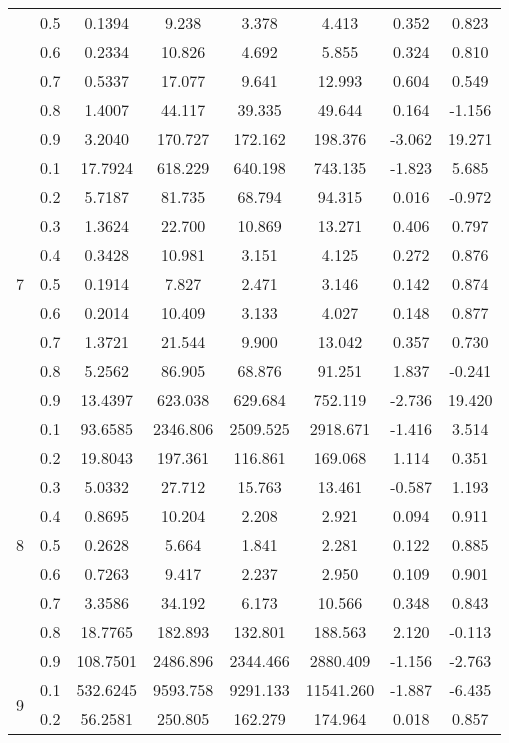 \documentclass[11pt,a4paper]{report}
\begin{document}
\begin{longtable}{ | c | c || c | c | c | c | c | c | }
 & 0.5 & 0.1394 & 9.238 & 3.378 & 4.413 & 0.352 & 0.823 \\
 & 0.6 & 0.2334 & 10.826 & 4.692 & 5.855 & 0.324 & 0.810 \\
 & 0.7 & 0.5337 & 17.077 & 9.641 & 12.993 & 0.604 & 0.549 \\
 & 0.8 & 1.4007 & 44.117 & 39.335 & 49.644 & 0.164 & -1.156 \\
 & 0.9 & 3.2040 & 170.727 & 172.162 & 198.376 & -3.062 & 19.271 \\
 \hline
\multirow{9}{*}{7} & 0.1 & 17.7924 & 618.229 & 640.198 & 743.135 & -1.823 & 5.685 \\
 & 0.2 & 5.7187 & 81.735 & 68.794 & 94.315 & 0.016 & -0.972 \\
 & 0.3 & 1.3624 & 22.700 & 10.869 & 13.271 & 0.406 & 0.797 \\
 & 0.4 & 0.3428 & 10.981 & 3.151 & 4.125 & 0.272 & 0.876 \\
 & 0.5 & 0.1914 & 7.827 & 2.471 & 3.146 & 0.142 & 0.874 \\
 & 0.6 & 0.2014 & 10.409 & 3.133 & 4.027 & 0.148 & 0.877 \\
 & 0.7 & 1.3721 & 21.544 & 9.900 & 13.042 & 0.357 & 0.730 \\
 & 0.8 & 5.2562 & 86.905 & 68.876 & 91.251 & 1.837 & -0.241 \\
 & 0.9 & 13.4397 & 623.038 & 629.684 & 752.119 & -2.736 & 19.420 \\
 \hline
\multirow{9}{*}{8} & 0.1 & 93.6585 & 2346.806 & 2509.525 & 2918.671 & -1.416 & 3.514 \\
 & 0.2 & 19.8043 & 197.361 & 116.861 & 169.068 & 1.114 & 0.351 \\
 & 0.3 & 5.0332 & 27.712 & 15.763 & 13.461 & -0.587 & 1.193 \\
 & 0.4 & 0.8695 & 10.204 & 2.208 & 2.921 & 0.094 & 0.911 \\
 & 0.5 & 0.2628 & 5.664 & 1.841 & 2.281 & 0.122 & 0.885 \\
 & 0.6 & 0.7263 & 9.417 & 2.237 & 2.950 & 0.109 & 0.901 \\
 & 0.7 & 3.3586 & 34.192 & 6.173 & 10.566 & 0.348 & 0.843 \\
 & 0.8 & 18.7765 & 182.893 & 132.801 & 188.563 & 2.120 & -0.113 \\
 & 0.9 & 108.7501 & 2486.896 & 2344.466 & 2880.409 & -1.156 & -2.763 \\
 \hline
\multirow{9}{*}{9} & 0.1 & 532.6245 & 9593.758 & 9291.133 & 11541.260 & -1.887 & -6.435 \\
 & 0.2 & 56.2581 & 250.805 & 162.279 & 174.964 & 0.018 & 0.857 \\

\end{longtable}
\end{document}
